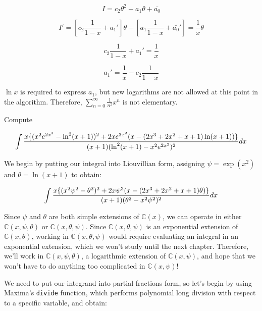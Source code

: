 $$I = c_2 \theta^2 + a_1 \theta + \bar{a_0}$$

$$I' = \left[ c_2 \frac{1}{1-x} + a_1' \right] \theta + \left[ a_1 \frac{1}{1-x} + \bar{a_0}' \right] = \frac{1}{x}\theta$$

$$c_2 \frac{1}{1-x} + a_1' = \frac{1}{x}$$

$$a_1' = \frac{1}{x} - c_2 \frac{1}{1-x}$$

$\ln x$ is required to express $a_1$, but new logarithms are not
allowed at this point in the algorithm.  Therefore,
$\sum_{n=0}^\infty \frac{1}{n^2} x^n$ is not elementary.

\endexample

\vfill\eject

\example\label{hard log-exp integral}
Compute


$$\int{{x\{(x^2e^{2x^2}-\ln^2(x+1))^2+2xe^{3x^2}(x-(2x^3+2x^2+x+1)\ln(x+1))\}}\over{(x+1)(\ln^2(x+1) - x^2e^{2x^2})^2}} dx$$

We begin by putting our integral into Liouvillian form, assigning $\psi = \exp(x^2)$ and $\theta = \ln (x+1)$ to obtain:



$$\int{{x\{(x^2 \psi^2-\theta^2)^2+2x \psi^3(x-(2x^3+2x^2+x+1)\theta)\}}\over{(x+1)(\theta^2 - x^2\psi^2)^2}} dx$$

Since $\psi$ and $\theta$ are both simple extensions of ${\mathbb C}(x)$, we can operate in either
${\mathbb C}(x,\psi,\theta)$ or ${\mathbb C}(x,\theta,\psi)$.  Since ${\mathbb C}(x,\theta,\psi)$
is an exponential extension of ${\mathbb C}(x,\theta)$, working in ${\mathbb C}(x,\theta,\psi)$
would require evaluating an integral in an exponential extension, which we won't study until
the next chapter.  Therefore, we'll work in ${\mathbb C}(x,\psi,\theta)$, a logarithmic
extension of ${\mathbb C}(x,\psi)$, and hope that we won't have to do anything
too complicated in ${\mathbb C}(x,\psi)$!

We need to put our integrand into partial fractions form, so let's begin by
using Maxima's {\tt divide} function, which performs polynomial long division
with respect to a specific variable, and obtain:


